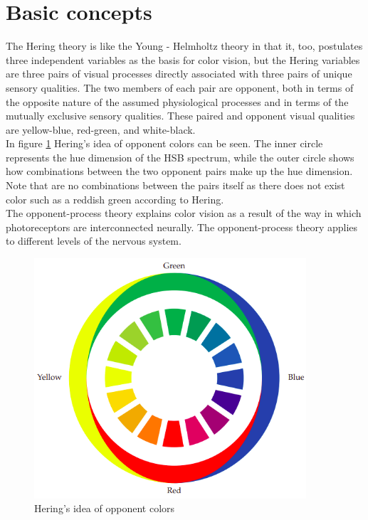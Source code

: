 \documentclass[a4paper,12pt,titlepage, oneside]{article}
\begin{document}
\section{Basic concepts}
The Hering theory is like the Young -
Helmholtz theory in that it, too, postulates 
three independent variables as the
basis for color vision, but the Hering
variables are three pairs of visual processes 
directly associated with three pairs
of unique sensory qualities. The two
members of each pair are opponent,
both in terms of the opposite nature of
the assumed physiological processes and
in terms of the mutually exclusive sensory 
qualities. These paired and opponent 
visual qualities are yellow-blue,
red-green, and white-black. \cite{hurvich1957opponent}\\
In figure \ref{HSB} Hering's idea of opponent colors can be seen.
The inner circle represents the hue dimension
of the HSB spectrum, while the outer circle 
shows how combinations between the two 
opponent pairs make up the hue dimension. Note
that are no combinations between the pairs itself as 
there does not exist color such as a reddish green
according to Hering.\cite{SPCbook}\\
The opponent-process theory explains 
color vision as a result of the way in 
which photoreceptors are interconnected 
neurally. The opponent-process theory 
applies to different levels of the nervous system.\\
\begin{figure}[h!]
        \centering
        \includegraphics[width=0.9\textwidth]{HSB}
        \caption{Hering's idea of opponent colors \cite{SPCbook}}
\label{HSB}
\end{figure}
\end{document}
